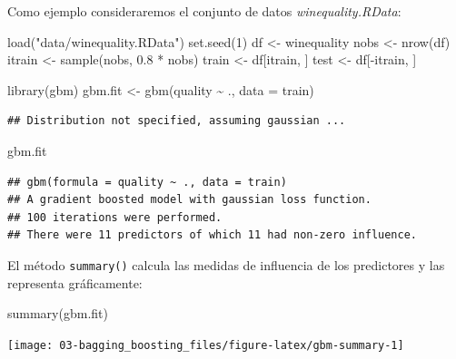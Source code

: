 \documentclass[
  spanish,
]{book}
\newenvironment{Shaded}{\begin{snugshade}}{\end{snugshade}}
\newcommand{\AttributeTok}[1]{\textcolor[rgb]{0.77,0.63,0.00}{#1}}
\newcommand{\DecValTok}[1]{\textcolor[rgb]{0.00,0.00,0.81}{#1}}
\newcommand{\FloatTok}[1]{\textcolor[rgb]{0.00,0.00,0.81}{#1}}
\newcommand{\FunctionTok}[1]{\textcolor[rgb]{0.00,0.00,0.00}{#1}}
\newcommand{\NormalTok}[1]{#1}
\newcommand{\OtherTok}[1]{\textcolor[rgb]{0.56,0.35,0.01}{#1}}
\newcommand{\SpecialCharTok}[1]{\textcolor[rgb]{0.00,0.00,0.00}{#1}}
\newcommand{\StringTok}[1]{\textcolor[rgb]{0.31,0.60,0.02}{#1}}
\theoremstyle{break}
\theoremstyle{definition}
\theoremstyle{definition}
\theoremstyle{definition}
\theoremstyle{definition}
\theoremstyle{remark}
\begin{document}
Como ejemplo consideraremos el conjunto de datos \emph{winequality.RData}:

\begin{Shaded}
\begin{Highlighting}[]
\FunctionTok{load}\NormalTok{(}\StringTok{"data/winequality.RData"}\NormalTok{)}
\FunctionTok{set.seed}\NormalTok{(}\DecValTok{1}\NormalTok{)}
\NormalTok{df }\OtherTok{\textless{}{-}}\NormalTok{ winequality}
\NormalTok{nobs }\OtherTok{\textless{}{-}} \FunctionTok{nrow}\NormalTok{(df)}
\NormalTok{itrain }\OtherTok{\textless{}{-}} \FunctionTok{sample}\NormalTok{(nobs, }\FloatTok{0.8} \SpecialCharTok{*}\NormalTok{ nobs)}
\NormalTok{train }\OtherTok{\textless{}{-}}\NormalTok{ df[itrain, ]}
\NormalTok{test }\OtherTok{\textless{}{-}}\NormalTok{ df[}\SpecialCharTok{{-}}\NormalTok{itrain, ]}

\FunctionTok{library}\NormalTok{(gbm)}
\NormalTok{gbm.fit }\OtherTok{\textless{}{-}} \FunctionTok{gbm}\NormalTok{(quality }\SpecialCharTok{\textasciitilde{}}\NormalTok{ ., }\AttributeTok{data =}\NormalTok{ train)}
\end{Highlighting}
\end{Shaded}

\begin{verbatim}
## Distribution not specified, assuming gaussian ...
\end{verbatim}

\begin{Shaded}
\begin{Highlighting}[]
\NormalTok{gbm.fit}
\end{Highlighting}
\end{Shaded}

\begin{verbatim}
## gbm(formula = quality ~ ., data = train)
## A gradient boosted model with gaussian loss function.
## 100 iterations were performed.
## There were 11 predictors of which 11 had non-zero influence.
\end{verbatim}

El método \texttt{summary()} calcula las medidas de influencia de los predictores y las representa gráficamente:

\begin{Shaded}
\begin{Highlighting}[]
\FunctionTok{summary}\NormalTok{(gbm.fit)}
\end{Highlighting}
\end{Shaded}

\begin{center}\texttt{[image: 03-bagging\_boosting\_files/figure-latex/gbm-summary-1]} \end{center}
\end{document}
